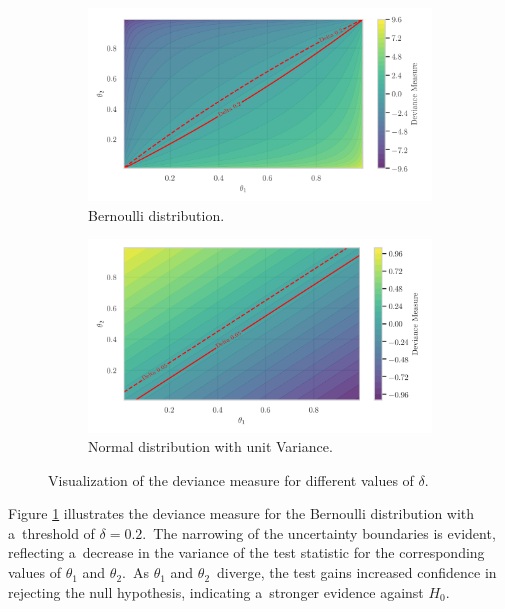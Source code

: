 \documentclass[magisterska, english]{pwr_wmat_praca_dyplomowa}
\theoremstyle{plain}
\numberwithin{theorem}{chapter}
\theoremstyle{definition}
\numberwithin{theorem}{chapter}
\begin{document}
\begin{figure}[H]
	\centering
	\begin{subfigure}{.5\textwidth}
		\centering
		\includegraphics[width=1\linewidth]{images/bernoulli_deviance.png}
		\caption{Bernoulli distribution.}
		\label{fig:bernoulli_deviance}
	\end{subfigure}%
	\begin{subfigure}[r]{.5\textwidth}
		\centering
		\includegraphics[width=1\linewidth]{images/normal_deviance.png}
		\caption{Normal distribution with unit Variance.}
		\label{fig:normal_deviance}
	\end{subfigure}
	\caption{Visualization of the deviance measure for different values of \(\delta\).}
	\label{fig:deviance}
\end{figure}

Figure \ref{fig:bernoulli_deviance} illustrates the deviance measure for the Bernoulli distribution with a~threshold of \(\delta = 0.2\).~The narrowing of the uncertainty boundaries is evident, reflecting a~decrease in the variance of the test statistic for the corresponding values of \(\theta_1\) and \(\theta_2\).~As \(\theta_1\) and \(\theta_2\)~diverge, the test gains increased confidence in rejecting the null hypothesis, indicating a~stronger evidence against \(H_0\).
\end{document}
